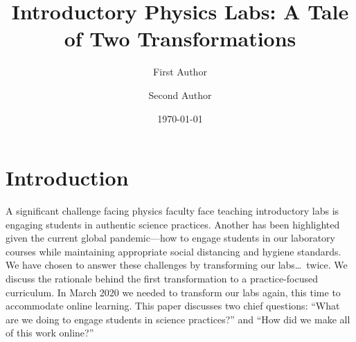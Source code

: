 \documentclass[aip, numerical, preprint]{revtex4-2}
\begin{document}
\title{Introductory Physics Labs: A Tale of Two Transformations}


\author{First Author} 

\author{Second Author} 

\date{\today}


\maketitle

\section{Introduction}
A significant challenge facing physics faculty face teaching introductory labs is engaging
students in authentic science practices.\citep{national2007Rising,PCAST12,kozminski2014aapt}
Another has been highlighted given the current global pandemic---how to engage students in our
laboratory courses while maintaining appropriate social distancing and hygiene standards. We
have chosen to answer these challenges by transforming our labs\ldots\ twice. We discuss the
rationale behind the first transformation to a practice-focused curriculum.  In March 2020 we
needed to transform our labs again, this time to accommodate online learning. This paper
discusses two chief questions: ``What are we doing to engage students in science practices?''
and ``How did we make all of this work online?''
\end{document}
